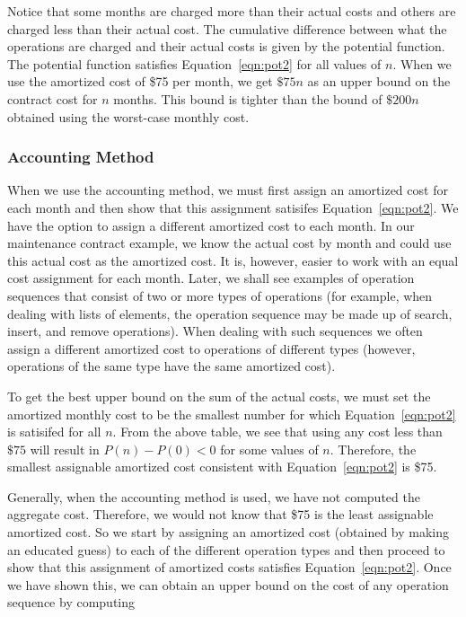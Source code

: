 Notice that some months are charged more than their actual costs and others are
charged less than their actual cost. The cumulative difference between what
the operations are charged and their actual costs is given by the
potential function. The potential function satisfies Equation~\ref{eqn:pot2}
for all
values of $n$.
When we use the amortized cost of \$75 per month,
we get $\$75n$ as an upper bound on the
contract cost for $n$ months. This bound
is tighter than the bound of
$\$200n$ obtained using the worst-case monthly cost.

\subsubsection*{Accounting Method}
When we use the accounting method, we must first assign an amortized cost
for each month and then show that this assignment satisifes Equation~\ref{eqn:pot2}.
We have the option to assign a different amortized cost to each month.
In our maintenance contract example, we know the actual cost by month and could use this
actual cost as the amortized cost.  It is, however, easier to work with
an equal cost assignment for each month. Later, we shall see examples
of operation sequences that consist of two or more types of operations
(for example, when dealing with lists of elements, the operation sequence
may be made up of search, insert, and remove operations). When dealing
with such sequences we often assign a different amortized cost to operations
of different types (however,
operations of the same type have the same amortized cost).

To get the best upper bound on the sum of the
actual costs, we must set the amortized monthly cost to be the smallest number
for which Equation~\ref{eqn:pot2} is satisifed for all $n$.
From the above table, we see that using any cost less than
$\$75$ will result in $P(n) - P(0) < 0$
for some values of $n$. Therefore, the smallest
assignable amortized cost consistent with Equation~\ref{eqn:pot2} is
\$75.

Generally, when the accounting method is used, we have not computed the
aggregate cost. Therefore, we would not know that \$75
is the least assignable amortized cost.
So we start by assigning an amortized cost (obtained by making
an educated guess) to each of the
different operation types and then proceed to show that this assignment of
amortized costs satisfies Equation~\ref{eqn:pot2}.
Once we have shown this, we can
obtain an upper bound on the cost of any operation sequence by computing


